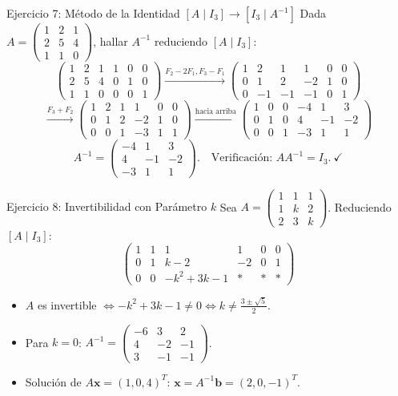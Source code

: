 \documentclass[11pt]{beamer}
\newcommand{\vv}[1]{\mathbf{#1}}
\begin{document}
\begin{frame}{Ejercicio 7: Método de la Identidad $[A \mid I_3] \to [I_3 \mid A^{-1}]$}
  Dada $A = \begin{pmatrix} 1 & 2 & 1 \\ 2 & 5 & 4 \\ 1 & 1 & 0 \end{pmatrix}$, hallar $A^{-1}$ reduciendo $[A \mid I_3]$:
  \[
    \left(\begin{array}{ccc|ccc} 1&2&1&1&0&0 \\ 2&5&4&0&1&0 \\ 1&1&0&0&0&1 \end{array}\right)
    \xrightarrow{F_2-2F_1, F_3-F_1}
    \left(\begin{array}{ccc|ccc} 1&2&1&1&0&0 \\ 0&1&2&-2&1&0 \\ 0&-1&-1&-1&0&1 \end{array}\right)
  \]
  \[
    \xrightarrow{F_3+F_2}
    \left(\begin{array}{ccc|ccc} 1&2&1&1&0&0 \\ 0&1&2&-2&1&0 \\ 0&0&1&-3&1&1 \end{array}\right)
    \xrightarrow{\text{hacia arriba}}
    \left(\begin{array}{ccc|ccc} 1&0&0&-4&1&3 \\ 0&1&0&4&-1&-2 \\ 0&0&1&-3&1&1 \end{array}\right)
  \]
  \vfill
  \[
    A^{-1} = \begin{pmatrix} -4 & 1 & 3 \\ 4 & -1 & -2 \\ -3 & 1 & 1 \end{pmatrix}. \quad \text{Verificación: } A A^{-1} = I_3. \ \checkmark
  \]
\end{frame}

\begin{frame}{Ejercicio 8: Invertibilidad con Parámetro $k$}
  Sea $A = \begin{pmatrix} 1 & 1 & 1 \\ 1 & k & 2 \\ 2 & 3 & k \end{pmatrix}$. Reduciendo $[A \mid I_3]$:
  \[
    \left(\begin{array}{ccc|ccc} 1&1&1&1&0&0 \\ 0&1&k-2&-2&0&1 \\ 0&0&-k^2+3k-1&\ast&\ast&\ast \end{array}\right)
  \]
  \vfill
  \begin{itemize}
    \item $A$ es invertible $\iff -k^2+3k-1 \neq 0 \iff k \neq \frac{3 \pm \sqrt{5}}{2}$.
    \item Para $k=0$: $A^{-1} = \begin{pmatrix} -6 & 3 & 2 \\ 4 & -2 & -1 \\ 3 & -1 & -1 \end{pmatrix}$.
    \item Solución de $A\vv{x} = (1, 0, 4)^T$: $\vv{x} = A^{-1}\vv{b} = (2, 0, -1)^T$.
  \end{itemize}
\end{frame}
\end{document}
